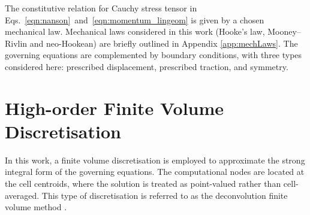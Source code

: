 \documentclass[sn-mathphys,Numbered]{sn-jnl}%
\begin{document}
The constitutive relation for Cauchy stress tensor in Eqs.~\eqref{eqn:nanson}~and~\eqref{eqn:momentum_lingeom} is given by a chosen mechanical law.
Mechanical laws considered in this work (Hooke's law, Mooney–Rivlin and neo-Hookean) are briefly outlined in Appendix \ref{app:mechLaws}.
The governing equations are complemented by boundary conditions, with three types considered here: prescribed displacement, prescribed traction, and symmetry.
%
%
\section{High-order Finite Volume Discretisation}
\label{sec:HO-FVD}
%
%
In this work, a finite volume discretisation is employed to approximate the strong integral form of the governing equations.
The computational nodes are located at the cell centroids, where the solution is treated as point-valued rather than cell-averaged.
This type of discretisation is referred to as the deconvolution finite volume method \cite{Nishikawa2025, Nishikawa2021}.
%
\end{document}
